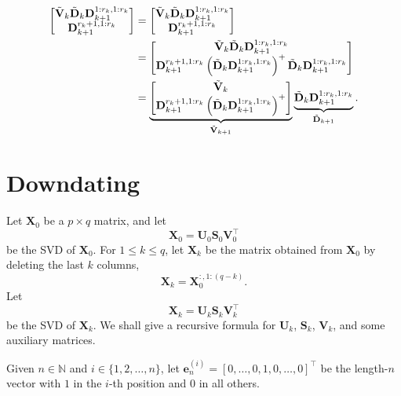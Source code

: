 \documentclass[11pt,a4paper]{article}
\newcommand{\0}{\M{0}}
\newcommand{\M}[1]{\mathbf{#1}}
\newcommand{\Mt}[1]{\tilde{\M{#1}}}
\newcommand{\N}{\mathbb{N}}
\newcommand{\T}{\top}
\newcommand{\eve}[2]{\mathbf{e}^{(#1)}_{#2}}
\begin{document}
\begin{align*}
  \begin{bmatrix}
    \Mt{V}_k \Mt{D}_k \M{D}^{1:r_k, 1:r_k}_{k+1}
    \\
    \M{D}^{r_k+1, 1:r_k}_{k+1}
  \end{bmatrix}
  & =
  \begin{bmatrix}
    \Mt{V}_k \Mt{D}_k \M{D}^{1:r_k, 1:r_k}_{k+1}
    \\
    \M{D}^{r_k+1, 1:r_k}_{k+1}
  \end{bmatrix}
  \\
  & =
  \begin{bmatrix}
    \Mt{V}_k \Mt{D}_k \M{D}^{1:r_k, 1:r_k}_{k+1}
    \\
    \M{D}^{r_k+1, 1:r_k}_{k+1}
    \left(\Mt{D}_k \M{D}^{1:r_k,1:r_k}_{k+1}\right)^+
    \Mt{D}_k \M{D}^{1:r_k, 1:r_k}_{k+1}
  \end{bmatrix}
   \\
  & =
    \underbrace{%
  \begin{bmatrix}
    \Mt{V}_k
    \\
    \M{D}^{r_k+1, 1:r_k}_{k+1}
    \left(\Mt{D}_k \M{D}^{1:r_k,1:r_k}_{k+1}\right)^+
  \end{bmatrix}
  }_{\Mt{V}_{k+1}}
  \underbrace{%
  \Mt{D}_k \M{D}^{1:r_k, 1:r_k}_{k+1}
  }_{\Mt{D}_{k+1}}.
\end{align*}

\section{Downdating}

Let $\M{X}_0$ be a $p \times q$ matrix, and let
\begin{displaymath}
  \M{X}_0 = \M{U}_0 \M{S}_0 \M{V}_0^\T
\end{displaymath}
be the SVD of $\M{X}_0$.
For $1 \leq k \leq q$, let $\M{X}_k$ be the matrix obtained from $\M{X}_0$ by deleting the last $k$ columns,
\begin{displaymath}
  \M{X}_k = \M{X}_0^{:,1:(q -k)}.
\end{displaymath}
Let 
\begin{displaymath}
  \M{X}_k = \M{U}_k \M{S}_k\M{V}_k^\T
\end{displaymath}
be the SVD of $\M{X}_k$. We shall give a recursive formula for $\M{U}_k$, $\M{S}_k$, $\M{V}_k$, and some auxiliary matrices.

Given $n \in \N$ and $i \in \{1,2, \dots, n\}$, let $\eve{i}{n} = [0, \dots, 0, 1, 0, \dots, 0]^\T$ be the length-$n$ vector with $1$ in the $i$-th position and $0$ in all others.
\end{document}
